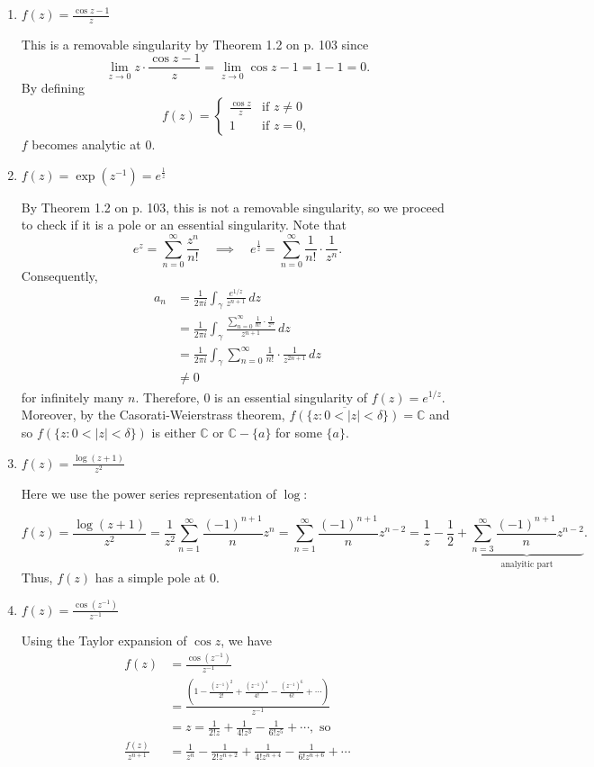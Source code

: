 \documentclass[11pt,oneside,english]{amsart}
\theoremstyle{definition}
\newcommand{\lom}[2]{\lim_{{#1}\rightarrow{#2}}}
\newcommand{\MB}[1]{\mathbb{#1}}
\begin{document}
\begin{enumerate}
\begin{enumerate}
\item $\displaystyle f(z)=\frac{\cos z-1}{z}$

This is a removable singularity by Theorem 1.2 on p. 103 since 
\[
\lom{z}{0}z\cdot \frac{\cos z-1}{z}=\lom{z}{0}\cos z-1=1-1=0.
\]
By defining
\[
f(z)=\begin{cases}\frac{\cos z}{z} & \text{if }z\neq0\\ 1 & \text{if }z=0,\end{cases}
\]
$f$ becomes analytic at 0.

\item $f(z)=\exp(z^{-1})=e^{\frac{1}{z}}$

By Theorem 1.2 on p. 103, this is not a removable singularity, so we proceed to check if it is a pole or an essential singularity. Note that
\[
e^z=\sum_{n=0}^\infty\frac{z^n}{n!} \quad \implies \quad e^{\frac{1}{z}}=\sum_{n=0}^\infty\frac{1}{n!}\cdot\frac{1}{z^n}.
\]
Consequently,
\begin{align*}
a_n&=\frac{1}{2\pi i}\int_\gamma \frac{e^{1/z}}{z^{n+1}}\,dz\\[2mm]
&=\frac{1}{2\pi i}\int_\gamma\frac{\sum_{n=0}^\infty\frac{1}{n!}\cdot\frac{1}{z^n}}{z^{n+1}}\,dz\\[2mm]
&=\frac{1}{2\pi i}\int_\gamma\sum_{n=0}^\infty\frac{1}{n!}\cdot\frac{1}{z^{2n+1}}\,dz\\[2mm]
&\neq 0
\end{align*}
for infinitely many $n$. Therefore, 0 is an essential singularity of $f(z)=e^{1/z}$. Moreover, by the Casorati-Weierstrass theorem, $\overline{f(\{z:0<|z|<\delta\})}=\MB{C}$ and so $f(\{z:0<|z|<\delta\})$ is either $\MB{C}$ or $\MB{C}-\{a\}$ for some $\{a\}$.

\item $\displaystyle f(z)=\frac{\log(z+1)}{z^2}$

Here we use the power series representation of $\log$:

\[
f(z)=\frac{\log(z+1)}{z^2}=\frac{1}{z^2}\sum_{n=1}^\infty\frac{(-1)^{n+1}}{n}z^n=\sum_{n=1}^\infty\frac{(-1)^{n+1}}{n}z^{n-2}=\frac{1}{z}-\frac{1}{2}+\underbrace{\sum_{n=3}^\infty\frac{(-1)^{n+1}}{n}z^{n-2}}_\text{analyitic part}.
\]
Thus, $f(z)$ has a simple pole at 0.

\item $\displaystyle f(z)=\frac{\cos(z^{-1})}{z^{-1}}$

Using the Taylor expansion of $\cos z$, we have
\begin{align*}
f(z)&=\frac{\cos(z^{-1})}{z^{-1}}\\[2mm]
&=\frac{\left(1-\frac{(z^{-1})^2}{2!}+\frac{(z^{-1})^4}{4!}-\frac{(z^{-1})^6}{6!}+\cdots\right)}{z^{-1}}\\[2mm]
&=z=\frac{1}{2!z}+\frac{1}{4!z^3}-\frac{1}{6!z^5}+\cdots,\text{ so}\\[2mm]
\frac{f(z)}{z^{n+1}}&=\frac{1}{z^n}-\frac{1}{2!z^{n+2}}+\frac{1}{4!z^{n+4}}-\frac{1}{6!z^{n+6}}+\cdots
\end{align*}


\end{enumerate}
\end{enumerate}
\end{document}
